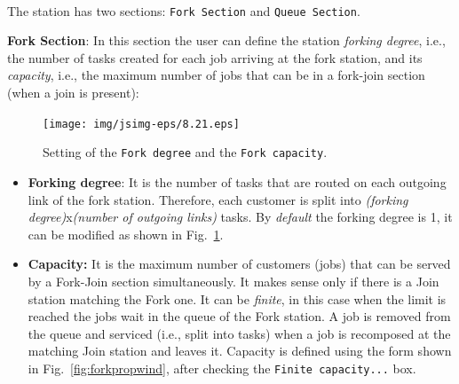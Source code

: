 \\
 The station has two
sections: \texttt{Fork Section} and \texttt{Queue Section}.

\noindent \textbf{Fork Section}: In this section the user can
define the station \emph{forking degree}, i.e., the number of
tasks created for each job arriving at the fork station, and its
\emph{capacity}, i.e., the maximum number of jobs that can be in a
fork-join section (when a join is present):
\begin{figure}[htb]
    \begin{center}
        \texttt{[image: img/jsimg-eps/8.21.eps]}
    \end{center}
    \caption{Setting of the \texttt{Fork degree} and the \texttt{Fork capacity}.}
    \label{fig:forkdegcap}
\end{figure}
\begin{itemize}
\item \textbf{Forking degree}: It is the number of tasks that are
routed on each outgoing link of the fork station. Therefore, each
customer is split into \emph{(forking degree)}x\emph{(number of
outgoing links)} tasks. By \emph{default} the forking degree is 1,
it can be modified as shown in Fig.~\ref{fig:forkdegcap}. \item
\textbf{Capacity:} It is the maximum number of customers (jobs)
that can be served by a Fork-Join section simultaneously. It makes
sense only if there is a Join station matching the Fork one. It
can be \emph{finite}, in this case when the limit is reached the
jobs wait in the queue of the Fork station. A job is removed from
the queue and serviced (i.e., split into tasks) when a job is
recomposed at the matching Join station and leaves it. Capacity is
defined using the form shown in Fig.~\ref{fig:forkpropwind}, after
checking the \texttt{Finite capacity...} box.
\end{itemize}


